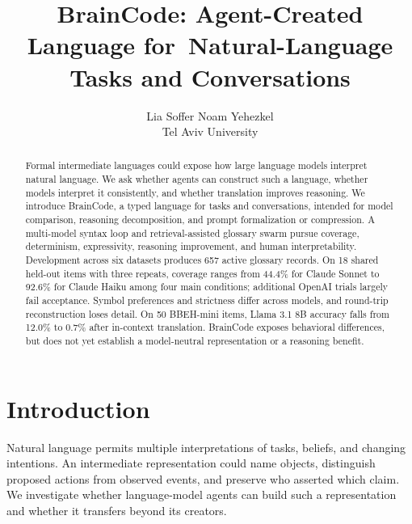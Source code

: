 \documentclass[11pt]{article}
\title{BrainCode: Agent-Created Language for\ Natural-Language Tasks and Conversations}
\author{Lia Soffer \quad Noam Yehezkel \\
 Tel Aviv University}
\date{}
\newcommand{\bc}{BrainCode}
\begin{document}
\maketitle
\begin{abstract}
Formal intermediate languages could expose how large language models interpret natural language. We ask whether agents can construct such a language, whether models interpret it consistently, and whether translation improves reasoning. We introduce \bc{}, a typed language for tasks and conversations, intended for model comparison, reasoning decomposition, and prompt formalization or compression. A multi-model syntax loop and retrieval-assisted glossary swarm pursue coverage, determinism, expressivity, reasoning improvement, and human interpretability. Development across six datasets produces 657 active glossary records. On 18 shared held-out items with three repeats, coverage ranges from 44.4\% for Claude Sonnet to 92.6\% for Claude Haiku among four main conditions; additional OpenAI trials largely fail acceptance. Symbol preferences and strictness differ across models, and round-trip reconstruction loses detail. On 50 BBEH-mini items, Llama 3.1 8B accuracy falls from 12.0\% to 0.7\% after in-context translation. \bc{} exposes behavioral differences, but does not yet establish a model-neutral representation or a reasoning benefit.
\end{abstract}

\section{Introduction}
Natural language permits multiple interpretations of tasks, beliefs, and changing intentions. An intermediate representation could name objects, distinguish proposed actions from observed events, and preserve who asserted which claim. We investigate whether language-model agents can build such a representation and whether it transfers beyond its creators.
\end{document}
